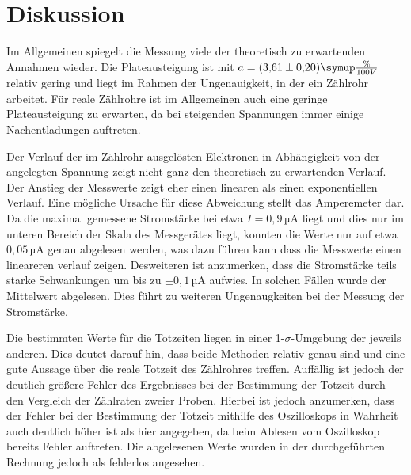 \newpage
\section{Diskussion}
\label{sec:Diskussion}

Im Allgemeinen spiegelt die Messung viele der theoretisch zu erwartenden Annahmen
wieder. Die Plateausteigung ist mit $a=(3{,}61 \pm 0{,}20) \symup{\frac{\%}{100V}}$
relativ gering und liegt im Rahmen der Ungenauigkeit, in der ein Zählrohr arbeitet.
Für reale Zählrohre ist im Allgemeinen auch eine geringe Plateausteigung zu erwarten,
da bei steigenden Spannungen immer einige Nachentladungen auftreten.

Der Verlauf der im Zählrohr ausgelösten Elektronen in Abhängigkeit von der angelegten
Spannung zeigt nicht ganz den theoretisch zu erwartenden Verlauf. Der Anstieg
der Messwerte zeigt eher einen linearen als einen exponentiellen Verlauf. Eine
mögliche Ursache für diese Abweichung stellt das Amperemeter dar. Da die maximal
gemessene Stromstärke bei etwa $I=0{,}9\,$µA liegt und dies nur im unteren Bereich
der Skala des Messgerätes liegt, konnten die Werte nur auf etwa $0{,}05\,$µA genau
abgelesen werden, was dazu führen kann dass die Messwerte einen lineareren verlauf
zeigen. Desweiteren ist anzumerken, dass die Stromstärke teils starke Schwankungen
um bis zu $\pm 0{,}1\,$µA aufwies. In solchen Fällen wurde der Mittelwert abgelesen.
Dies führt zu weiteren Ungenaugkeiten bei der Messung der Stromstärke.

Die bestimmten Werte für die  Totzeiten liegen in einer 1-$\sigma$-Umgebung der jeweils
anderen. Dies deutet darauf hin, dass beide Methoden relativ genau sind und
eine gute Aussage über die reale Totzeit des Zählrohres treffen. Auffällig
ist jedoch der deutlich größere Fehler des Ergebnisses bei der Bestimmung der Totzeit
durch den Vergleich der Zählraten zweier Proben. Hierbei ist jedoch anzumerken,
dass der Fehler bei der Bestimmung der Totzeit mithilfe des Oszilloskops in Wahrheit
auch deutlich höher ist als hier angegeben, da beim Ablesen vom Oszilloskop bereits
Fehler auftreten. Die abgelesenen Werte wurden in der durchgeführten Rechnung jedoch als
fehlerlos angesehen.

